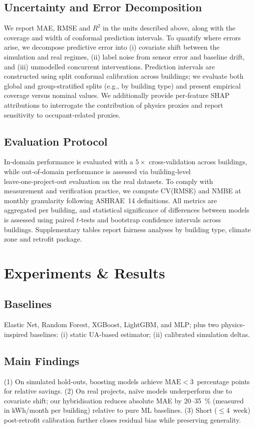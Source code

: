 ﻿\documentclass{article}
\begin{document}
\subsection{Uncertainty and Error Decomposition}
We report MAE, RMSE and $R^2$ in the units described above, along with the coverage and width of conformal prediction intervals. To quantify where errors arise, we decompose predictive error into (i) covariate shift between the simulation and real regimes, (ii) label noise from sensor error and baseline drift, and (iii) unmodelled concurrent interventions. Prediction intervals are constructed using split conformal calibration across buildings; we evaluate both global and group‑stratified splits (e.g., by building type) and present empirical coverage versus nominal values. We additionally provide per‑feature SHAP attributions to interrogate the contribution of physics proxies and report sensitivity to occupant‑related proxies.
\subsection{Evaluation Protocol}
In‑domain performance is evaluated with a $5\times$ cross‑validation across buildings, while out‑of‑domain performance is assessed via building‑level leave‑one‑project‑out evaluation on the real datasets. To comply with measurement and verification practice, we compute CV(RMSE) and NMBE at monthly granularity following ASHRAE~14 definitions. All metrics are aggregated per building, and statistical significance of differences between models is assessed using paired $t$‑tests and bootstrap confidence intervals across buildings. Supplementary tables report fairness analyses by building type, climate zone and retrofit package.

\section{Experiments \& Results}
\subsection{Baselines}
Elastic Net, Random Forest, XGBoost, LightGBM, and MLP; plus two physics-inspired baselines: (i) static UA-based estimator; (ii) calibrated simulation deltas.

\subsection{Main Findings}
(1) On simulated hold‑outs, boosting models achieve $\mathrm{MAE}<3$~percentage points for relative savings. (2) On real projects, naïve models underperform due to covariate shift; our hybridisation reduces absolute MAE by 20--35~\% (measured in kWh/month per building) relative to pure ML baselines. (3) Short (\mbox{$\leq$4~week}) post‑retrofit calibration further closes residual bias while preserving generality.
\end{document}

